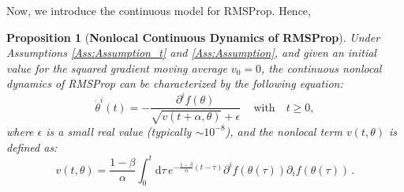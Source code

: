 \documentclass{article} %
\newtheorem{proposition}{Proposition}
\begin{document}
Now, we introduce the continuous model for RMSProp. Hence,
\begin{proposition}[\textbf{Nonlocal Continuous Dynamics of RMSProp}]\label{prop:RMSProp}
Under Assumptions \ref{Ass:Assumption_t} and \ref{Ass:Assumption}, and given an initial value for the squared gradient moving average \( v_0 = 0 \), the continuous nonlocal dynamics of RMSProp can be characterized by the following equation:
\begin{equation}\label{eq:RMSProp_cont}
     \dot{\theta}^i(t) = - \frac{\partial^i f(\theta)}{\sqrt{v(t + \alpha, \theta)} + \epsilon}\,  \quad \text{with} \quad t \geq 0,
\end{equation}
where \( \epsilon \) is a small real value (typically \( \sim 10^{-8} \)), and the nonlocal term \( v(t, \theta) \) is defined as:
\begin{equation*}
    v(t,\theta) = \frac{1-\beta}{\alpha} \int^t_0 \mathrm{d}\tau\,e^{-\frac{1-\beta}{\alpha} (t-\tau)} \partial^i f(\theta(\tau)) \partial_i f(\theta(\tau))\,.
\end{equation*}
\end{proposition}
\end{document}
